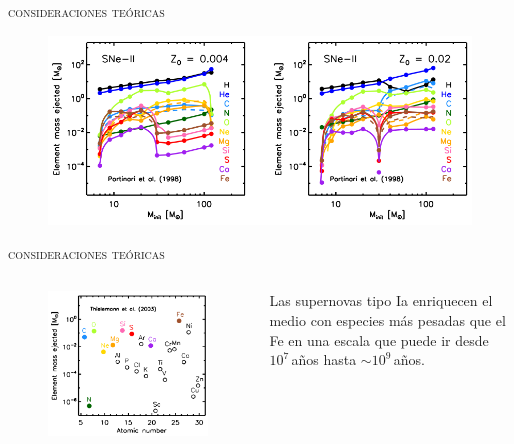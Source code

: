 \documentclass[xcolor=dvipsnames,4pt,hyperref={colorlinks,citecolor=black,linkcolor=black,urlcolor=black}]{beamer}
\begin{document}
\begin{frame}{\textsc{consideraciones teóricas}}

\begin{figure}
\includegraphics[scale=1]{img/yates2013-4}
\end{figure}
\end{frame}

\begin{frame}{\textsc{consideraciones teóricas}}

\begin{columns}
\begin{figure}
\includegraphics[scale=0.8]{img/yates2013-3}
\end{figure}
Las supernovas tipo Ia enriquecen el medio con especies más pesadas que el Fe en una escala que
puede ir desde $10^7\,$años hasta $\sim10^9\,$años.
\end{columns}
\end{frame}
\end{document}

